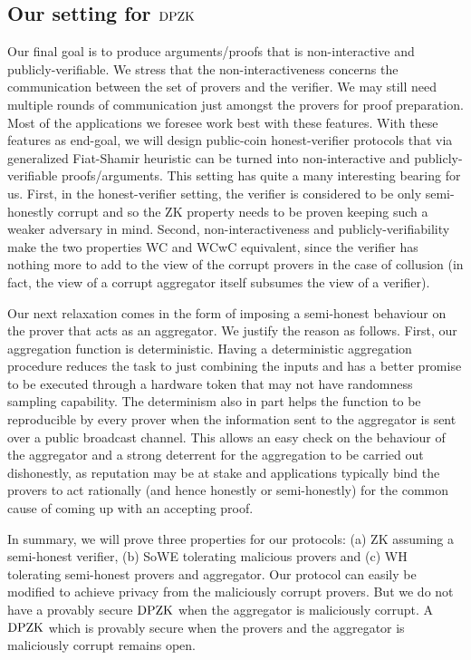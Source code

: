 \subsection{Our setting for $\text{DPZK}$}\label{subsec:our_setting}
Our final goal is to produce arguments/proofs that is non-interactive and publicly-verifiable.  We stress that the non-interactiveness concerns the communication between the set of provers and the verifier. We may still need multiple rounds of communication just amongst the provers for proof preparation.   Most of the applications we foresee work best  with these features. With these features as end-goal, we  will design public-coin honest-verifier  protocols that via generalized Fiat-Shamir heuristic \cite{FS86, BCS16} can be turned into non-interactive and publicly-verifiable proofs/arguments. This setting has quite a many interesting bearing for us. First,   in the honest-verifier setting, the verifier is considered to be only semi-honestly corrupt and so the ZK property needs to be proven keeping such a weaker adversary in mind. Second,  non-interactiveness and publicly-verifiability make the two properties WC and WCwC equivalent, since the verifier has nothing more to add to the view of the corrupt provers in the case of collusion (in fact, the view of a corrupt aggregator itself subsumes the view of a verifier). 

Our next relaxation comes in the form of imposing a semi-honest behaviour on the prover that acts as an aggregator. We justify the reason as follows.  First,  our aggregation function is deterministic. Having  a deterministic aggregation procedure reduces the task to just combining the inputs and has a better promise to be executed through a hardware token that may not have randomness sampling capability.  The determinism also in part helps the function to be reproducible by every prover  when the information sent to the aggregator is sent over a public broadcast channel. This allows an easy check on the behaviour of the aggregator and a strong deterrent for the aggregation to be carried out dishonestly, as reputation may be at stake and applications typically bind the provers to act rationally (and hence honestly or semi-honestly) for the common cause of coming up with an accepting proof.  %

In summary,  we will prove three properties for our protocols: (a) ZK assuming a
semi-honest verifier, (b)  SoWE tolerating  malicious provers and (c) WH
tolerating semi-honest provers and aggregator. Our protocol can easily be modified to achieve privacy from the maliciously corrupt provers. But we do not have a provably secure $\text{DPZK}$ when the aggregator is maliciously corrupt. A $\text{DPZK}$ which is provably secure when the provers and the aggregator is maliciously corrupt remains open. 

